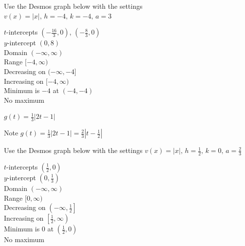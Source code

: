 \documentclass{ximera}
\begin{document}
\begin{question}
\begin{problem}
\begin{solution}
Use the Desmos graph below with the settings $v(x)=|x|,\,h=-4,\,k=-4,\,a=3$

\begin{center} 
\end{center}

$t$-intercepts $\left(-\frac{16}{3}, 0\right)$, $\left(-\frac{8}{3}, 0\right)$ \\ $y$-intercept $(0, 8)$ \\ Domain $(-\infty, \infty)$ \\ Range $[-4, \infty)$ \\ Decreasing on $(-\infty, -4]$ \\ Increasing on $[-4, \infty)$ \\ Minimum is $-4$ at $(-4,-4)$ \\ No maximum \\ 
\end{solution}
\end{problem}
  
\begin{problem}\label{graphbasicabsvalexerlast}
$g(t) = \frac{1}{3}|2t - 1|$

\begin{solution}
Note $g(t) = \frac{1}{3}|2t - 1| = \frac{2}{3}|t - \frac{1}{2}|$

Use the Desmos graph below with the settings $v(x)=|x|,\,h=\frac{1}{2},\,k=0,\,a=\frac{2}{3}$

\begin{center} 
\end{center}

$t$-intercepts $\left(\frac{1}{2}, 0\right)$ \\ $y$-intercept $\left(0, \frac{1}{3}\right)$ \\ Domain $(-\infty, \infty)$ \\ Range $[0, \infty)$ \\ Decreasing on $\left(-\infty, \frac{1}{2}\right]$ \\ Increasing on $\left[\frac{1}{2}, \infty\right)$ \\ Minimum is $0$ at $\left(\frac{1}{2},0\right)$ \\ No maximum \\ 
\end{solution}
\end{problem}
\end{question}
\end{document}
